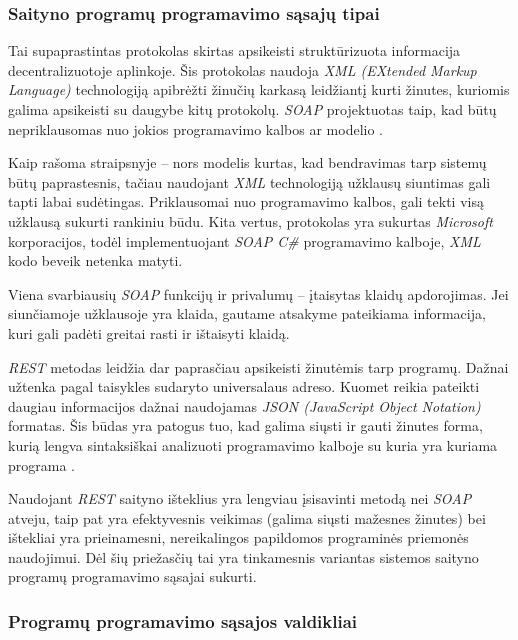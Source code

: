 \documentclass{VUMIFPSbakalaurinis}
\begin{document}
\subsubsection{Saityno programų programavimo sąsajų tipai}


Tai supaprastintas protokolas skirtas apsikeisti struktūrizuota informacija decentralizuotoje aplinkoje. Šis protokolas naudoja \textit{XML (EXtended Markup Language)} technologiją apibrėžti žinučių karkasą leidžiantį kurti žinutes, kuriomis galima apsikeisti su daugybe kitų protokolų. \textit{SOAP} projektuotas taip, kad būtų nepriklausomas nuo jokios programavimo kalbos ar modelio \cite{SoapDocs}.

Kaip rašoma straipsnyje \cite{SoapRest} – nors modelis kurtas, kad bendravimas tarp sistemų būtų paprastesnis, tačiau naudojant \textit{XML} technologiją užklausų siuntimas gali tapti labai sudėtingas. Priklausomai nuo programavimo kalbos, gali tekti visą užklausą sukurti rankiniu būdu. Kita vertus, protokolas yra sukurtas \textit{Microsoft} korporacijos, todėl implementuojant \textit{SOAP C\#} programavimo kalboje, \textit{XML} kodo beveik netenka matyti.

Viena svarbiausių \textit{SOAP} funkcijų ir privalumų – įtaisytas klaidų apdorojimas. Jei siunčiamoje užklausoje yra klaida, gautame atsakyme pateikiama informacija, kuri gali padėti greitai rasti ir ištaisyti klaidą.


\textit{REST} metodas leidžia dar paprasčiau apsikeisti žinutėmis tarp programų. Dažnai užtenka pagal taisykles sudaryto universalaus adreso. Kuomet reikia pateikti daugiau informacijos dažnai naudojamas \textit{JSON (JavaScript Object Notation)} formatas. Šis būdas yra patogus tuo, kad galima siųsti ir gauti žinutes forma, kurią lengva sintaksiškai analizuoti programavimo kalboje su kuria yra kuriama programa \cite{SoapRest}.

Naudojant \textit{REST} saityno išteklius yra lengviau įsisavinti metodą nei \textit{SOAP} atveju, taip pat yra efektyvesnis veikimas (galima siųsti mažesnes žinutes) bei ištekliai yra prieinamesni, nereikalingos papildomos programinės priemonės naudojimui. Dėl šių priežasčių tai yra tinkamesnis variantas sistemos saityno programų programavimo sąsajai sukurti.

\subsubsection{Programų programavimo sąsajos valdikliai}
\end{document}
